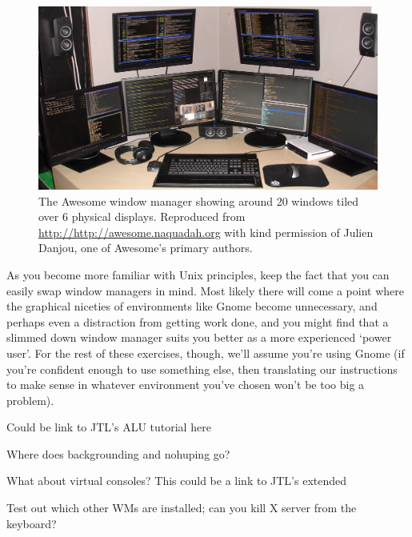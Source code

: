 \begin{figure}[htb]
  \begin{center}
    \includegraphics[width=14cm]{images/awesome.png}
  \end{center}
\caption{The Awesome window manager showing around 20 windows tiled over 6 physical displays. Reproduced from \url{http://http://awesome.naquadah.org} with kind permission of Julien Danjou, one of Awesome's primary authors.}
\label{figure:awesome}
\end{figure}

As you become more familiar with Unix principles, keep the fact that you can easily swap window managers in mind. Most likely there will come a point where the graphical niceties of environments like Gnome become unnecessary, and perhaps even a distraction from getting work done, and you might find that a slimmed down window manager suits you better as a more experienced `power user'. For the rest of these exercises, though, we'll assume you're using Gnome (if you're confident enough to use something else, then translating our instructions to make sense in whatever environment you've chosen won't be too big a problem). 

\begin{note}
Could be link to JTL's ALU tutorial here
\end{note}


\begin{note}
Where does backgrounding and nohuping go?
\end{note}

\begin{note}
What about virtual consoles? This could be a link to JTL's extended 
\end{note}

\begin{note}
Test out which other WMs are installed; can you kill X server from the keyboard?
\end{note}

